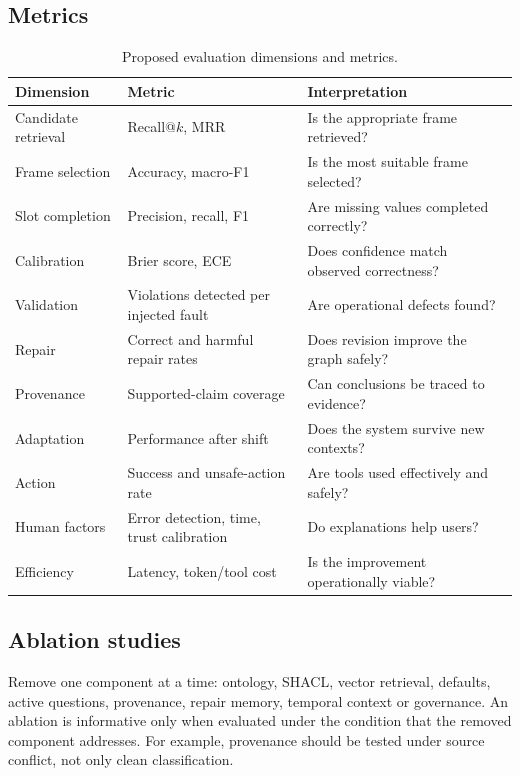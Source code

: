 \documentclass[11pt,a4paper]{article}
\begin{document}
\subsection{Metrics}

\begin{table}[ht]
\centering
\caption{Proposed evaluation dimensions and metrics.}
\label{tab:metrics}
\begin{tabularx}{\textwidth}{p{}Y Y}
\toprule
\textbf{Dimension} & \textbf{Metric} & \textbf{Interpretation} \\
\midrule
Candidate retrieval & Recall@$k$, MRR & Is the appropriate frame retrieved? \\
Frame selection & Accuracy, macro-F1 & Is the most suitable frame selected? \\
Slot completion & Precision, recall, F1 & Are missing values completed correctly? \\
Calibration & Brier score, ECE & Does confidence match observed correctness? \\
Validation & Violations detected per injected fault & Are operational defects found? \\
Repair & Correct and harmful repair rates & Does revision improve the graph safely? \\
Provenance & Supported-claim coverage & Can conclusions be traced to evidence? \\
Adaptation & Performance after shift & Does the system survive new contexts? \\
Action & Success and unsafe-action rate & Are tools used effectively and safely? \\
Human factors & Error detection, time, trust calibration & Do explanations help users? \\
Efficiency & Latency, token/tool cost & Is the improvement operationally viable? \\
\bottomrule
\end{tabularx}
\end{table}

\subsection{Ablation studies}

Remove one component at a time: ontology, SHACL, vector retrieval, defaults,
active questions, provenance, repair memory, temporal context or governance.
An ablation is informative only when evaluated under the condition that the
removed component addresses. For example, provenance should be tested under
source conflict, not only clean classification.
\end{document}

